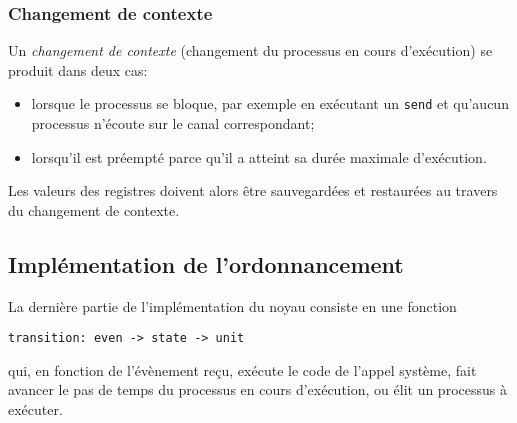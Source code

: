 \documentclass[french, toc]{../cs-classes/cs-classes}
\begin{document}
\subsubsection{Changement de contexte}
Un \emph{changement de contexte} (changement du processus en cours d'exécution) se produit dans deux cas:
\begin{itemize}
    \item lorsque le processus se bloque, par exemple en exécutant un \texttt{send} et qu'aucun processus n'écoute sur le canal correspondant;
    \item lorsqu'il est préempté parce qu'il a atteint sa durée maximale d'exécution.
\end{itemize}
Les valeurs des registres doivent alors être sauvegardées et restaurées au travers du changement de contexte.

\subsection{Implémentation de l'ordonnancement}
La dernière partie de l'implémentation du noyau consiste en une fonction
\begin{center}
    \texttt{transition: even -> state -> unit}
\end{center}
qui, en fonction de l'évènement reçu, exécute le code de l'appel système, fait avancer le pas de temps du processus en cours d'exécution, ou élit un processus à exécuter. 
\end{document}

